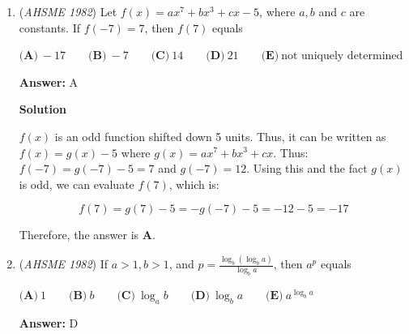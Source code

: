 \begin{enumerate}
 $\textbf {(A)}\ 672 \qquad  \textbf {(B)}\ 784 \qquad  \textbf {(C)}\ 840 \qquad  \textbf {(D)}\ 896 \qquad  \textbf {(E)}\ 1008$

 \textbf{Answer: }C



\textbf{Solution}

All of the digits of the numbers must be 0 to 9. If the first and last digits are x and y, we have $x-y=2$ and $0<x<9$ or $y-x=2,$ and $0<y<9.$ Substituting we have $0<x+2<9,$ and $0<y+2<9.$ Thus $0<x<7$ and $0<y<7,$ which yields 16 pairs (x, y) such that the absolute value of the difference between the x and y is $2.$ However, we are not done. If 0 is the last digit ( with the pair (0, 2):) then we won't have a 4 digit number, so our real value is 15. Because our digits are distinct, there are $(10-2)(10-3)$ ways to fill the middle 2 places with digits, thus by the multiplication principles (counting) there are $15\cdot56 = \boxed {\left(C\right) 840}$ numbers that fulfill these circumstances.

 


	\item (\textit{AHSME 1982}) Let $f(x) = ax^7+bx^3+cx-5$, where $a,b$ and $c$ are constants. If $f(-7) = 7$, then $f(7)$ equals 


 $\textbf {(A)}\ -17 \qquad  \textbf {(B)}\ -7 \qquad \textbf {(C)}\ 14 \qquad  \textbf {(D)}\ 21\qquad  \textbf {(E)}\ \text{not uniquely determined}$

 \textbf{Answer: }A



\textbf{Solution}

$f(x)$ is an odd function shifted down 5 units. Thus, it can be written as $f(x)=g(x)-5$ where $g(x)=ax^7+bx^3+cx$. Thus: $f(-7)=g(-7)-5=7$ and $g(-7)=12$. Using this and the fact $g(x)$ is odd, we can evaluate $f(7)$, which is:

 
 \[f(7) = g(7)-5 = -g(-7)-5 = -12-5 = -17\]

 Therefore, the answer is $\boxed{ \textbf{A}}$.

 


	\item (\textit{AHSME 1982}) If $a>1, b>1$, and $p=\frac{\log_b(\log_ba)}{\log_ba}$, then $a^p$ equals 


 $\textbf {(A)}\ 1 \qquad  \textbf {(B)}\ b \qquad  \textbf {(C)}\ \log_ab \qquad  \textbf {(D)}\ \log_ba \qquad  \textbf {(E)}\ a^{\log_ba}$

 \textbf{Answer: }D




\end{enumerate}
